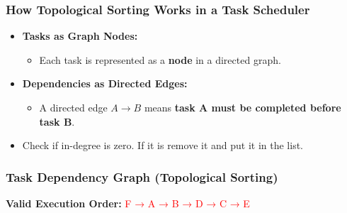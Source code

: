 \begin{frame}
    \frametitle{\textbf{How Topological Sorting Works in a Task Scheduler}}
    \begin{itemize}
        \item \textbf{Tasks as Graph Nodes:}
        \begin{itemize}
            \item Each task is represented as a \textbf{node} in a directed graph.
        \end{itemize}
        \vspace{0.3cm}
        \item \textbf{Dependencies as Directed Edges:}
        \begin{itemize}
            \item A directed edge \( A \rightarrow B \) means \textbf{task A must be completed before task B}.
        \end{itemize}
    \end{itemize}
    \begin{itemize}
        \item Check if in-degree is zero. If it is remove it and put it in the list.
        \end{itemize}
\end{frame}

\begin{frame}
    \frametitle{\textbf{Task Dependency Graph (Topological Sorting)}}
    \centering

    \vspace{0.3cm}
    \textbf{Valid Execution Order:} \textcolor{red}{F → A → B → D → C → E}
\end{frame}



